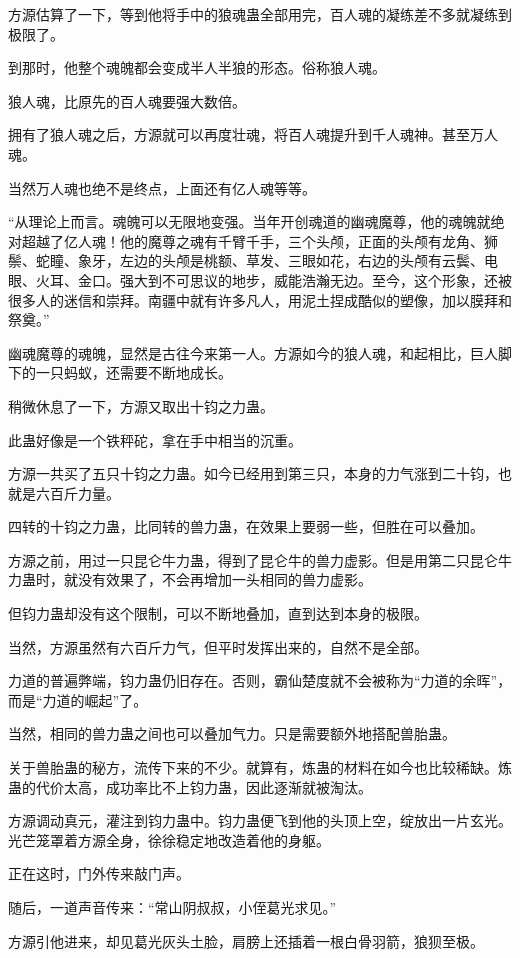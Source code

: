 \begin{this_body}
方源估算了一下，等到他将手中的狼魂蛊全部用完，百人魂的凝练差不多就凝练到极限了。

到那时，他整个魂魄都会变成半人半狼的形态。俗称狼人魂。

狼人魂，比原先的百人魂要强大数倍。

拥有了狼人魂之后，方源就可以再度壮魂，将百人魂提升到千人魂神。甚至万人魂。

当然万人魂也绝不是终点，上面还有亿人魂等等。

“从理论上而言。魂魄可以无限地变强。当年开创魂道的幽魂魔尊，他的魂魄就绝对超越了亿人魂！他的魔尊之魂有千臂千手，三个头颅，正面的头颅有龙角、狮鬃、蛇瞳、象牙，左边的头颅是桃额、草发、三眼如花，右边的头颅有云鬓、电眼、火耳、金口。强大到不可思议的地步，威能浩瀚无边。至今，这个形象，还被很多人的迷信和崇拜。南疆中就有许多凡人，用泥土捏成酷似的塑像，加以膜拜和祭奠。”

幽魂魔尊的魂魄，显然是古往今来第一人。方源如今的狼人魂，和起相比，巨人脚下的一只蚂蚁，还需要不断地成长。

稍微休息了一下，方源又取出十钧之力蛊。

此蛊好像是一个铁秤砣，拿在手中相当的沉重。

方源一共买了五只十钧之力蛊。如今已经用到第三只，本身的力气涨到二十钧，也就是六百斤力量。

四转的十钧之力蛊，比同转的兽力蛊，在效果上要弱一些，但胜在可以叠加。

方源之前，用过一只昆仑牛力蛊，得到了昆仑牛的兽力虚影。但是用第二只昆仑牛力蛊时，就没有效果了，不会再增加一头相同的兽力虚影。

但钧力蛊却没有这个限制，可以不断地叠加，直到达到本身的极限。

当然，方源虽然有六百斤力气，但平时发挥出来的，自然不是全部。

力道的普遍弊端，钧力蛊仍旧存在。否则，霸仙楚度就不会被称为“力道的余晖”，而是“力道的崛起”了。

当然，相同的兽力蛊之间也可以叠加气力。只是需要额外地搭配兽胎蛊。

关于兽胎蛊的秘方，流传下来的不少。就算有，炼蛊的材料在如今也比较稀缺。炼蛊的代价太高，成功率比不上钧力蛊，因此逐渐就被淘汰。

方源调动真元，灌注到钧力蛊中。钧力蛊便飞到他的头顶上空，绽放出一片玄光。光芒笼罩着方源全身，徐徐稳定地改造着他的身躯。

正在这时，门外传来敲门声。

随后，一道声音传来：“常山阴叔叔，小侄葛光求见。”

方源引他进来，却见葛光灰头土脸，肩膀上还插着一根白骨羽箭，狼狈至极。


\end{this_body}
